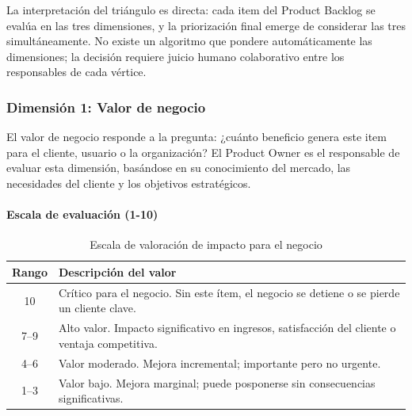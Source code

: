 \FloatBarrier

La interpretación del triángulo es directa: cada item del Product Backlog se evalúa en las tres dimensiones, y la priorización final emerge de considerar las tres simultáneamente. No existe un algoritmo que pondere automáticamente las dimensiones; la decisión requiere juicio humano colaborativo entre los responsables de cada vértice.

\subsubsection{Dimensión 1: Valor de negocio}

El valor de negocio responde a la pregunta: ¿cuánto beneficio genera este item para el cliente, usuario o la organización? El Product Owner es el responsable de evaluar esta dimensión, basándose en su conocimiento del mercado, las necesidades del cliente y los objetivos estratégicos.

\paragraph{Escala de evaluación (1-10)}

\begin{table}[h]
    \centering
    \small
    \begin{tabularx}{\textwidth}{|c|X|}
        \hline
        \textbf{Rango} & \textbf{Descripción del valor}                                                                 \\
        \hline
        10             & Crítico para el negocio. Sin este ítem, el negocio se detiene o se pierde un cliente clave.    \\
        \hline
        7--9           & Alto valor. Impacto significativo en ingresos, satisfacción del cliente o ventaja competitiva. \\
        \hline
        4--6           & Valor moderado. Mejora incremental; importante pero no urgente.                                \\
        \hline
        1--3           & Valor bajo. Mejora marginal; puede posponerse sin consecuencias significativas.                \\
        \hline
    \end{tabularx}
    \caption{Escala de valoración de impacto para el negocio}
    \label{tab:escala-valor-negocio}
\end{table}

\FloatBarrier


